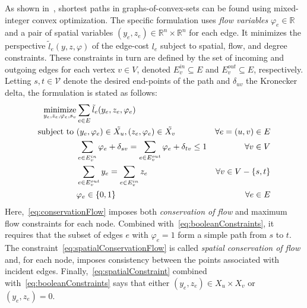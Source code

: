 \documentclass[letterpaper, 11pt]{article}
\begin{document}
As shown in~\cite{}, shortest paths in graphs-of-convex-sets  can be found
using mixed-integer convex optimization.  The specific formulation uses
\emph{flow variables} $\varphi_e \in \mathbb{R}$ and a pair of spatial
variables $(y_e, z_e) \in \mathbb{R}^n \times \mathbb{R}^n$ for each edge.  It
minimizes the perspective $\tilde l_e(y, z, \varphi)$ of the edge-cost $l_e$
subject to spatial, flow, and degree constraints.  These constraints in turn
are defined by the set of incoming and outgoing edges for each vertex $v \in
V$, denoted $E^{in}_v \subseteq E$ and $E^{out}_v \subseteq E$, respectively.
Letting $s, t \in \mathcal{V}$ denote the desired end-points of the path and
$\delta_{uv}$ the Kronecker delta, the formulation is stated as follows:
\begin{subequations}\label{eq:shortest_path}
  \begin{align}
  \operatorname*{minimize}_{y_e, z_e, \varphi_e, s_v} &\sum_{e\in E}\tilde l_e(y_e, z_e, \varphi_e) \nonumber \\
  \mbox{subject to }  
  & (y_e, \varphi_e) \in \tilde{ X_u},    (z_e, \varphi_e) \in \tilde{ X_v}  &\forall  e=(u, v) \in E \label{eq:spatialConstraint}\\
  & \sum_{e \in E^{in}_v} \varphi_e + \delta_{sv} = \sum_{e \in E^{out}_v} \varphi_e + \delta_{tv} \le 1 &\forall v \in V  \label{eq:conservationFlow}\\
  & \sum_{e \in E^{out}_v} y_e = \sum_{e \in E^{in}_v} z_e &\forall v \in V - \{s, t\}   \label{eq:spatialConservationFlow}\\ 
  & \varphi_e \in \{0, 1\}  & \forall  e \in E  \label{eq:booleanConstraints}
  \end{align}
\end{subequations}
Here,~\eqref{eq:conservationFlow}  imposes both \emph{conservation of flow} and
maximum flow constraints for each node. Combined with~\eqref{eq:booleanConstraints},
it requires that the subset of edges $e$ with $\varphi_e = 1$ form a simple path from $s$ to $t$.
The constraint~\eqref{eq:spatialConservationFlow}
is called \emph{spatial conservation of flow} and, for each node, imposes consistency between
the points associated with incident  edges. Finally,~\eqref{eq:spatialConstraint} combined with~\eqref{eq:booleanConstraints}
says that either $(y_e, z_e) \in X_u \times X_v$  or $(y_e, z_e) = 0$.
\end{document}
